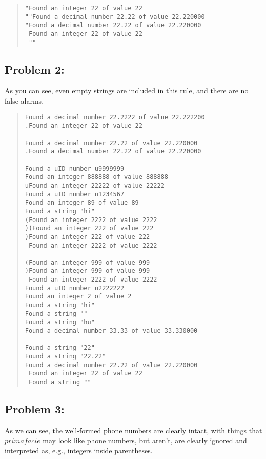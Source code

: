 \documentclass[a4paper]{article}
\begin{document}
\begin{quote}
\begin{verbatim}
"Found an integer 22 of value 22
""Found a decimal number 22.22 of value 22.220000
"Found a decimal number 22.22 of value 22.220000
 Found an integer 22 of value 22
 ""
\end{verbatim}
\end{quote}

\subsection*{Problem 2:}

As you can see, even empty strings are included in this rule, and there are no false alarms.

\begin{quote}
\begin{verbatim}
Found a decimal number 22.2222 of value 22.222200
.Found an integer 22 of value 22

Found a decimal number 22.22 of value 22.220000
.Found a decimal number 22.22 of value 22.220000

Found a uID number u9999999
Found an integer 888888 of value 888888
uFound an integer 22222 of value 22222
Found a uID number u1234567
Found an integer 89 of value 89
Found a string "hi"
(Found an integer 2222 of value 2222
)(Found an integer 222 of value 222
)Found an integer 222 of value 222
-Found an integer 2222 of value 2222

(Found an integer 999 of value 999
)Found an integer 999 of value 999
-Found an integer 2222 of value 2222
Found a uID number u2222222
Found an integer 2 of value 2
Found a string "hi"
Found a string ""
Found a string "hu"
Found a decimal number 33.33 of value 33.330000

Found a string "22"
Found a string "22.22"
Found a decimal number 22.22 of value 22.220000
 Found an integer 22 of value 22
 Found a string ""
\end{verbatim}
\end{quote}

\subsection*{Problem 3:}

As we can see, the well-formed phone numbers are clearly intact, with things that $prima facie$ may look like phone numbers, but aren't, are clearly ignored and interpreted as, e.g., integers inside parentheses.
\end{document}
